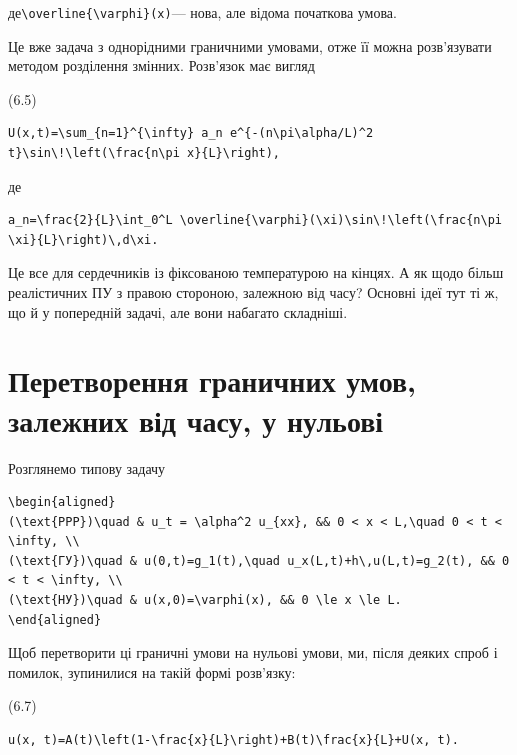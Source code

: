 \documentclass[
  ukrainian,
]{article}
\begin{document}
де\texttt{\textbackslash{}overline\{\textbackslash{}varphi\}(x)}---
нова, але відома початкова умова.

Це вже задача з однорідними граничними умовами, отже її можна
розв'язувати методом розділення змінних. Розв'язок має вигляд

(6.5)

\begin{verbatim}
U(x,t)=\sum_{n=1}^{\infty} a_n e^{-(n\pi\alpha/L)^2 t}\sin\!\left(\frac{n\pi x}{L}\right),
\end{verbatim}

де

\begin{verbatim}
a_n=\frac{2}{L}\int_0^L \overline{\varphi}(\xi)\sin\!\left(\frac{n\pi \xi}{L}\right)\,d\xi.
\end{verbatim}

Це все для сердечників із фіксованою температурою на кінцях. А як щодо
більш реалістичних ПУ з правою стороною, залежною від часу? Основні ідеї
тут ті ж, що й у попередній задачі, але вони набагато складніші.

\section{Перетворення граничних умов, залежних від часу, у
нульові}\label{ux43fux435ux440ux435ux442ux432ux43eux440ux435ux43dux43dux44f-ux433ux440ux430ux43dux438ux447ux43dux438ux445-ux443ux43cux43eux432-ux437ux430ux43bux435ux436ux43dux438ux445-ux432ux456ux434-ux447ux430ux441ux443-ux443-ux43dux443ux43bux44cux43eux432ux456}

Розглянемо типову задачу

\begin{verbatim}
\begin{aligned}
(\text{PPP})\quad & u_t = \alpha^2 u_{xx}, && 0 < x < L,\quad 0 < t < \infty, \\
(\text{ГУ})\quad & u(0,t)=g_1(t),\quad u_x(L,t)+h\,u(L,t)=g_2(t), && 0 < t < \infty, \\
(\text{НУ})\quad & u(x,0)=\varphi(x), && 0 \le x \le L.
\end{aligned}
\end{verbatim}

Щоб перетворити ці граничні умови на нульові умови, ми, після деяких
спроб і помилок, зупинилися на такій формі розв'язку:

(6.7)

\begin{verbatim}
u(x, t)=A(t)\left(1-\frac{x}{L}\right)+B(t)\frac{x}{L}+U(x, t).
\end{verbatim}
\end{document}
